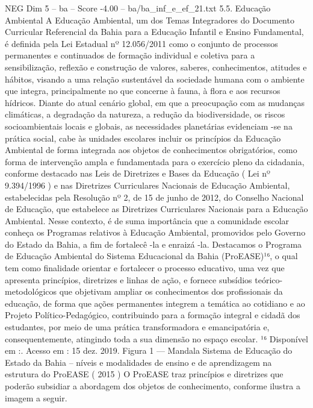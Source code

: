 \begin{textsample}{NEG Dim 5 – ba – Score -4.00 – ba/ba\_inf\_e\_ef\_21.txt}  \label{ex:f5_neg_003}
5.5.
Educação Ambiental A Educação Ambiental, um dos Temas Integradores do Documento Curricular Referencial da Bahia para a Educação Infantil e Ensino Fundamental, é definida pela Lei Estadual nº 12.056/2011 como o conjunto de processos permanentes e continuados de formação individual e coletiva para a sensibilização, reflexão e construção de valores, saberes, conhecimentos, atitudes e hábitos, visando a uma relação sustentável da sociedade humana com o ambiente que integra, principalmente no que concerne à fauna, à flora e aos recursos hídricos.
Diante do atual cenário global, em que a preocupação com as mudanças climáticas, a degradação da natureza, a redução da biodiversidade, os riscos socioambientais locais e globais, as necessidades planetárias evidenciam -se na prática social, cabe às unidades escolares incluir os princípios da Educação Ambiental de forma integrada aos objetos de conhecimentos obrigatórios, como forma de intervenção ampla e fundamentada para o exercício pleno da cidadania, conforme destacado nas Leis de Diretrizes e Bases da Educação ( Lei nº 9.394/1996 ) e nas Diretrizes Curriculares Nacionais de Educação Ambiental, estabelecidas pela Resolução nº 2, de 15 de junho de 2012, do Conselho Nacional de Educação, que estabelece as Diretrizes Curriculares Nacionais para a Educação Ambiental.
Nesse contexto, é de suma importância que a comunidade escolar conheça os Programas relativos à Educação Ambiental, promovidos pelo Governo do Estado da Bahia, a fim de fortalecê -la e enraizá -la.
Destacamos o Programa de Educação Ambiental do Sistema Educacional da Bahia (ProEASE)¹⁶, o qual tem como finalidade orientar e fortalecer o processo educativo, uma vez que apresenta princípios, diretrizes e linhas de ação, e fornece subsídios teórico-metodológicos que objetivam ampliar os conhecimentos dos profissionais da educação, de forma que ações permanentes integrem a temática ao cotidiano e ao Projeto Político-Pedagógico, contribuindo para a formação integral e cidadã dos estudantes, por meio de uma prática transformadora e emancipatória e, consequentemente, atingindo toda a sua dimensão no espaço escolar. ¹⁶ Disponível em :.
Acesso em : 15 dez. 2019.
Figura 1 — Mandala Sistema de Educação do Estado da Bahia – níveis e modalidades de ensino e de aprendizagem na estrutura do ProEASE ( 2015 ) O ProEASE traz princípios e diretrizes que poderão subsidiar a abordagem dos objetos de conhecimento, conforme ilustra a imagem a seguir.

\end{textsample}
